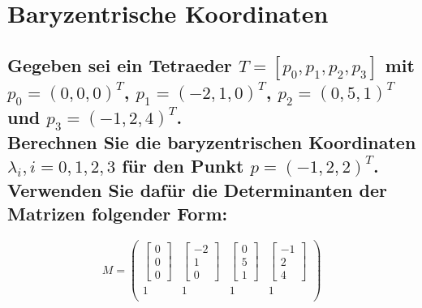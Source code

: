 \documentclass[a4paper,10pt,DIV=14]{scrartcl}
\begin{document}
\section{Baryzentrische Koordinaten}

\subsection{Gegeben sei ein Tetraeder $T = [p_0, p_1, p_2, p_3]$ mit $p_0 = (0, 0, 0)^T$, $p_1 = (-2, 1, 0)^T$, $p_2 = (0, 5, 1)^T$ und $p_3 = (-1, 2, 4)^T$. \vspace{.5em} \\  Berechnen Sie die baryzentrischen Koordinaten $\lambda_i, i = 0, 1, 2, 3$ für den Punkt $p = (-1, 2, 2)^T$. Verwenden Sie dafür die Determinanten der Matrizen folgender Form:}
	$$M = \begin{pmatrix}
	\begin{bmatrix}0\\0\\0\end{bmatrix} & \begin{bmatrix}-2\\1\\0\end{bmatrix} & \begin{bmatrix}0\\5\\1\end{bmatrix} & \begin{bmatrix}-1\\2\\4\end{bmatrix} \\
	1   & 1   & 1   & 1   \\
	\end{pmatrix}$$
\end{document}
